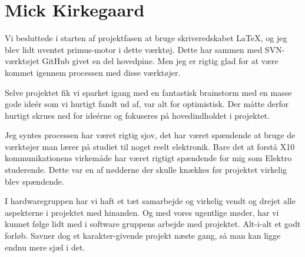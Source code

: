 \section{Mick Kirkegaard}
Vi besluttede i starten af projektfasen at bruge skriveredskabet LaTeX, og jeg blev lidt 
uventet primus-motor i dette værktøj. Dette har sammen med SVN-værktøjet GitHub givet en 
del hovedpine. Men jeg er rigtig glad for at være kommet igennem processen med disse værktøjer.

Selve projektet fik vi sparket igang med en fantastisk brainstorm med en masse gode ideér
som vi hurtigt fandt ud af, var alt for optimistisk. Der måtte derfor hurtigt skrues
ned for ideérne og fokuseres på hovedindholdet i projektet.

Jeg syntes processen har været rigtig sjov, det har været spændende at bruge de værktøjer
man lærer på studiet til noget reelt elektronik. Bare det at forstå X10 kommunikationens
virkemåde har været rigtigt spændende for mig som Elektro studerende. Dette var en af nødderne
der skulle knækkes før projektet virkelig blev spændende.

I hardwaregruppen har vi haft et tæt samarbejde og virkelig vendt og drejet alle aspekterne
i projektet med hinanden. Og med vores ugentlige møder, har vi kunnet følge lidt med i 
software gruppens arbejde med projektet. Alt-i-alt et godt forløb. Savner dog et karakter-givende
projekt næste gang, så man kan ligge endnu mere sjæl i det.